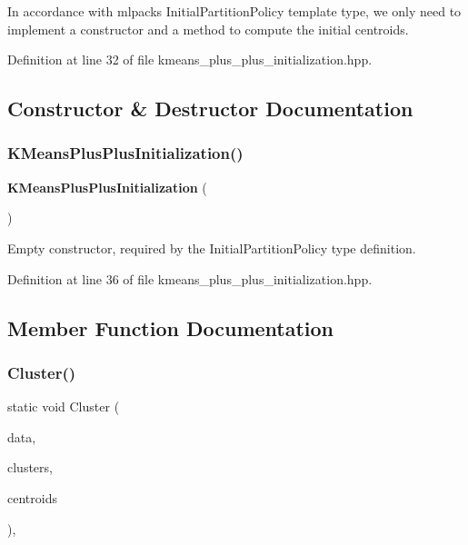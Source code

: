 In accordance with mlpack\textquotesingle{}s Initial\+Partition\+Policy template type, we only need to implement a constructor and a method to compute the initial centroids. 

Definition at line 32 of file kmeans\+\_\+plus\+\_\+plus\+\_\+initialization.\+hpp.



\subsection{Constructor \& Destructor Documentation}
\mbox{\label{classKMeansPlusPlusInitialization_a69d8fc81c3917d59282b0385f55c7b88}} 
\subsubsection{K\+Means\+Plus\+Plus\+Initialization()}
{\footnotesize\ttfamily \textbf{ K\+Means\+Plus\+Plus\+Initialization} (\begin{DoxyParamCaption}{ }\end{DoxyParamCaption})\hspace{0.3cm}{\ttfamily [inline]}}



Empty constructor, required by the Initial\+Partition\+Policy type definition. 



Definition at line 36 of file kmeans\+\_\+plus\+\_\+plus\+\_\+initialization.\+hpp.



\subsection{Member Function Documentation}
\mbox{\label{classKMeansPlusPlusInitialization_a8ee4dff98d318a0f5586140c5846ef39}} 
\subsubsection{Cluster()}
{\footnotesize\ttfamily static void Cluster (\begin{DoxyParamCaption}\item[{const Mat\+Type \&}]{data,  }\item[{const size\+\_\+t}]{clusters,  }\item[{arma\+::mat \&}]{centroids }\end{DoxyParamCaption})\hspace{0.3cm}{\ttfamily [inline]}, {\ttfamily [static]}}




